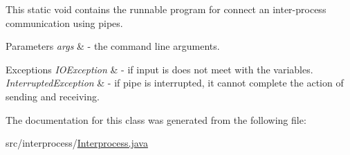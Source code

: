 This static void contains the runnable program for connect an inter-\/process communication using pipes. 
\begin{DoxyParams}{Parameters}
{\em args} & -\/ the command line arguments. \\
\hline
\end{DoxyParams}

\begin{DoxyExceptions}{Exceptions}
{\em I\+O\+Exception} & -\/ if input is does not meet with the variables. \\
\hline
{\em Interrupted\+Exception} & -\/ if pipe is interrupted, it cannot complete the action of sending and receiving. \\
\hline
\end{DoxyExceptions}


The documentation for this class was generated from the following file\+:\begin{DoxyCompactItemize}
\item 
src/interprocess/\hyperlink{_interprocess_8java}{Interprocess.\+java}\end{DoxyCompactItemize}
